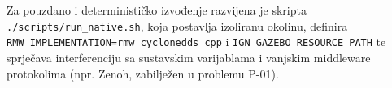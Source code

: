 Za pouzdano i determinističko izvođenje razvijena je skripta \texttt{./scripts/run\_native.sh}, koja
postavlja izoliranu okolinu, definira \texttt{RMW\_IMPLEMENTATION=rmw\_cyclonedds\_cpp} i
\texttt{IGN\_GAZEBO\_RESOURCE\_PATH} te sprječava interferenciju sa sustavskim varijablama i vanjskim
middleware protokolima (npr. Zenoh, zabilježen u problemu P-01).
